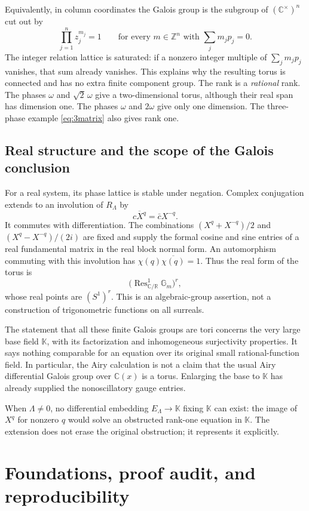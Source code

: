 \documentclass[11pt,a4paper]{article}
\numberwithin{equation}{section}
\theoremstyle{definition}
\theoremstyle{remark}
\newcommand{\K}{\mathbb K}
\newcommand{\R}{\mathbb R}
\newcommand{\C}{\mathbb C}
\newcommand{\Z}{\mathbb Z}
\begin{document}
Equivalently, in column coordinates the Galois group is the subgroup of
$(\C^\times)^n$ cut out by
\[
 \prod_{j=1}^n z_j^{m_j}=1
 \qquad\text{for every }m\in\Z^n\text{ with }\sum_jm_jp_j=0.
\]
The integer relation lattice is saturated: if a nonzero integer multiple
of $\sum_jm_jp_j$ vanishes, that sum already vanishes. This explains why
the resulting torus is connected and has no extra finite component group.
The rank is a \emph{rational} rank. The phases $\omega$ and
$\sqrt2\,\omega$ give a two-dimensional torus, although their real span
has dimension one. The phases $\omega$ and $2\omega$ give only one
dimension. The three-phase example \eqref{eq:3matrix} also gives rank one.

\subsection{Real structure and the scope of the Galois conclusion}
For a real system, its phase lattice is stable under negation.
Complex conjugation extends to an involution of $R_\Lambda$ by
\[
 \overline{cX^q}=\bar cX^{-q}.
\]
It commutes with differentiation. The combinations
$(X^q+X^{-q})/2$ and $(X^q-X^{-q})/(2i)$ are fixed and supply the
formal cosine and sine entries of a real fundamental matrix in the
real block normal form. An automorphism commuting with this involution
has $\chi(q)\overline{\chi(q)}=1$. Thus the real form of the torus is
\[
 \bigl(\operatorname{Res}^{1}_{\C/\R}\mathbb G_m\bigr)^r,
\]
whose real points are $(S^1)^r$. This is an algebraic-group assertion,
not a construction of trigonometric functions on all surreals.

The statement that all these finite Galois groups are tori concerns the
very large base field $\K$, with its factorization and inhomogeneous
surjectivity properties. It says nothing comparable for an equation over
its original small rational-function field. In particular, the Airy
calculation is not a claim that the usual Airy differential Galois group
over $\C(x)$ is a torus. Enlarging the base to $\K$ has already supplied
the nonoscillatory gauge entries.

When $\Lambda\ne0$, no differential embedding $E_\Lambda\to\K$ fixing
$\K$ can exist: the image of $X^q$ for nonzero $q$ would solve an
obstructed rank-one equation in $\K$. The extension does not erase the
original obstruction; it represents it explicitly.

\section{Foundations, proof audit, and reproducibility}\label{sec:audit}
\end{document}
